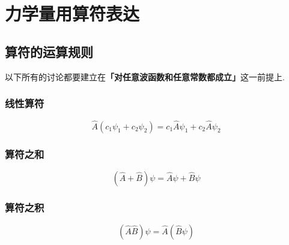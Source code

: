 \section{力学量用算符表达}

\subsection{算符的运算规则}
以下所有的讨论都要建立在\textbf{「对任意波函数和任意常数都成立」}这一前提上.

\subsubsection{线性算符}
\begin{equation}
    \hat{A}(c_1\psi_1+c_2\psi_2)=c_1\hat{A}\psi_1+c_2\hat{A}\psi_2
\end{equation}

\subsubsection{算符之和}
\begin{equation}
    \left(\hat{A}+\hat{B}\right)\psi = \hat{A}\psi+\hat{B}\psi
\end{equation}

\subsubsection{算符之积}
\begin{equation}
    \left(\hat{A}\hat{B}\right)\psi = \hat{A}\left(\hat{B}\psi\right)
\end{equation}

